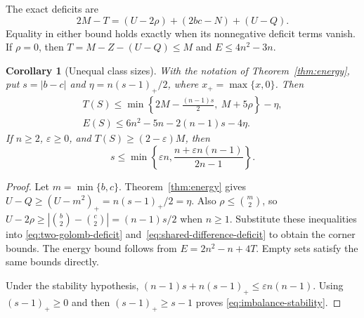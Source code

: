 \documentclass[11pt,a4paper]{article}
\newtheorem{corollary}[theorem]{Corollary}
\theoremstyle{definition}
\numberwithin{equation}{section}
\begin{document}
The exact deficits are
\begin{equation}\label{eq:two-golomb-deficit}
2M-T=(U-2\rho)+(2bc-N)+(U-Q).
\end{equation}
Equality in either bound holds exactly when its
nonnegative deficit terms vanish. If $\rho=0$, then
$T=M-Z-(U-Q)\le M$ and $E\le4n^2-3n$.

\begin{corollary}[Unequal class sizes]\label{cor:imbalance}
With the notation of Theorem~\ref{thm:energy}, put
$s=|b-c|$ and $\eta=n(s-1)_+/2$, where $x_+=\max\{x,0\}$. Then
\begin{equation}\label{eq:imbalance-bound}
\begin{gathered}
T(S)\le\min\left\{2M-\frac{(n-1)s}{2},\ M+5\rho\right\}-\eta,\\
E(S)\le6n^2-5n-2(n-1)s-4\eta.
\end{gathered}
\end{equation}
If $n\ge2$, $\varepsilon\ge0$, and $T(S)\ge(2-\varepsilon)M$, then
\begin{equation}\label{eq:imbalance-stability}
s\le\min\left\{\varepsilon n,
\frac{n+\varepsilon n(n-1)}{2n-1}\right\}.
\end{equation}
\end{corollary}
\begin{proof}
Let $m=\min\{b,c\}$. Theorem~\ref{thm:energy} gives
$U-Q\ge(U-m^2)_+=n(s-1)_+/2=\eta$.
Also $\rho\le\binom m2$, so
$U-2\rho\ge|\binom b2-\binom c2|=(n-1)s/2$ when $n\ge1$.
Substitute these inequalities into
\eqref{eq:two-golomb-deficit} and~\eqref{eq:shared-difference-deficit}
to obtain the corner bounds. The energy bound follows from
$E=2n^2-n+4T$. Empty sets satisfy the same bounds directly.

Under the stability hypothesis,
$(n-1)s+n(s-1)_+\le\varepsilon n(n-1)$.
Using $(s-1)_+\ge0$ and then $(s-1)_+\ge s-1$ proves
\eqref{eq:imbalance-stability}.
\end{proof}
\end{document}
